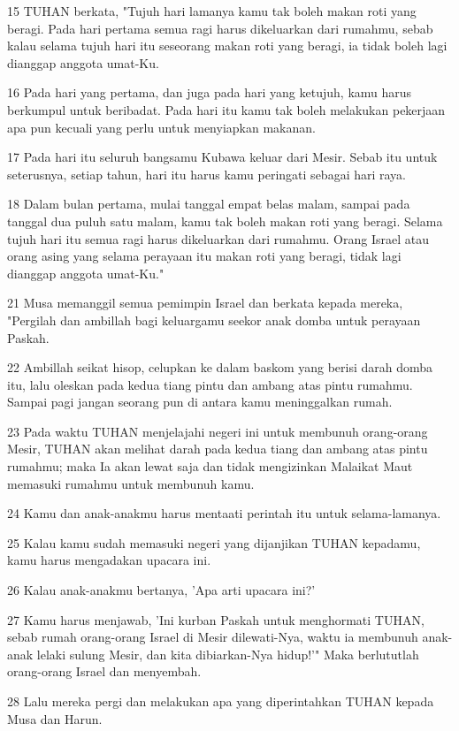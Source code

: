 \par 15 TUHAN berkata, "Tujuh hari lamanya kamu tak boleh makan roti yang beragi. Pada hari pertama semua ragi harus dikeluarkan dari rumahmu, sebab kalau selama tujuh hari itu seseorang makan roti yang beragi, ia tidak boleh lagi dianggap anggota umat-Ku.
\par 16 Pada hari yang pertama, dan juga pada hari yang ketujuh, kamu harus berkumpul untuk beribadat. Pada hari itu kamu tak boleh melakukan pekerjaan apa pun kecuali yang perlu untuk menyiapkan makanan.
\par 17 Pada hari itu seluruh bangsamu Kubawa keluar dari Mesir. Sebab itu untuk seterusnya, setiap tahun, hari itu harus kamu peringati sebagai hari raya.
\par 18 Dalam bulan pertama, mulai tanggal empat belas malam, sampai pada tanggal dua puluh satu malam, kamu tak boleh makan roti yang beragi. Selama tujuh hari itu semua ragi harus dikeluarkan dari rumahmu. Orang Israel atau orang asing yang selama perayaan itu makan roti yang beragi, tidak lagi dianggap anggota umat-Ku."
\par 21 Musa memanggil semua pemimpin Israel dan berkata kepada mereka, "Pergilah dan ambillah bagi keluargamu seekor anak domba untuk perayaan Paskah.
\par 22 Ambillah seikat hisop, celupkan ke dalam baskom yang berisi darah domba itu, lalu oleskan pada kedua tiang pintu dan ambang atas pintu rumahmu. Sampai pagi jangan seorang pun di antara kamu meninggalkan rumah.
\par 23 Pada waktu TUHAN menjelajahi negeri ini untuk membunuh orang-orang Mesir, TUHAN akan melihat darah pada kedua tiang dan ambang atas pintu rumahmu; maka Ia akan lewat saja dan tidak mengizinkan Malaikat Maut memasuki rumahmu untuk membunuh kamu.
\par 24 Kamu dan anak-anakmu harus mentaati perintah itu untuk selama-lamanya.
\par 25 Kalau kamu sudah memasuki negeri yang dijanjikan TUHAN kepadamu, kamu harus mengadakan upacara ini.
\par 26 Kalau anak-anakmu bertanya, 'Apa arti upacara ini?'
\par 27 Kamu harus menjawab, 'Ini kurban Paskah untuk menghormati TUHAN, sebab rumah orang-orang Israel di Mesir dilewati-Nya, waktu ia membunuh anak-anak lelaki sulung Mesir, dan kita dibiarkan-Nya hidup!'" Maka berlututlah orang-orang Israel dan menyembah.
\par 28 Lalu mereka pergi dan melakukan apa yang diperintahkan TUHAN kepada Musa dan Harun.

